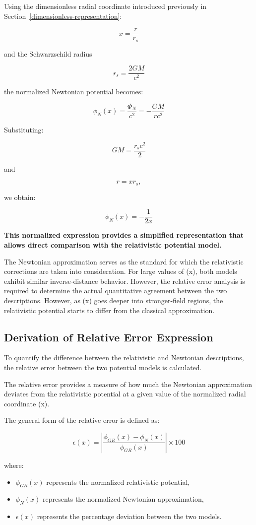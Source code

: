 \documentclass[
]{article}
\providecommand{\tightlist}{
  \setlength{\itemsep}{0pt}\setlength{\parskip}{0pt}}
\begin{document}
Using the dimensionless radial coordinate introduced previously in Section~\ref{dimensionless-representation}:

\[x=\frac{r}{r_s}\]

and the Schwarzschild radius

\[
r_s=\frac{2GM}{c^2}
\]

the normalized Newtonian potential becomes:

\[
\phi_N(x)=
\frac{\Phi_N}{c^2}
=
-\frac{GM}{rc^2}
\]

Substituting:

\[
GM=\frac{r_sc^2}{2}
\]

and

\[
r=xr_s,
\]

we obtain:

\[
\phi_N(x)=-\frac{1}{2x}
\]

\textbf{This normalized expression provides a simplified representation that
allows direct comparison with the relativistic potential model.} 

The Newtonian approximation serves as the standard for which the
relativistic corrections are taken into consideration. For large values
of (x), both models exhibit similar inverse-distance behavior. However,
the relative error analysis is required to determine the actual
quantitative agreement between the two descriptions. However, as (x)
goes deeper into stronger-field regions, the relativistic potential
starts to differ from the classical approximation.

\subsection{Derivation of Relative Error Expression}\label{derivation-of-relative-error-expression}

To quantify the difference between the relativistic and Newtonian
descriptions, the relative error between the two potential models is
calculated.

The relative error provides a measure of how much the Newtonian
approximation deviates from the relativistic potential at a given value
of the normalized radial coordinate (x).

The general form of the relative error is defined as:

\[
\epsilon(x)=
\left|
\frac{\phi_{GR}(x)-\phi_N(x)}
{\phi_{GR}(x)}
\right|
\times 100
\]

where:
\begin{itemize}
\tightlist
\item
  $\phi_{GR}(x)$ represents the normalized relativistic potential,
\item
  $\phi_{N}(x)$ represents the normalized Newtonian approximation,
\item
  $\epsilon(x)$ represents the percentage deviation between the two
  models.
\end{itemize}
\end{document}
